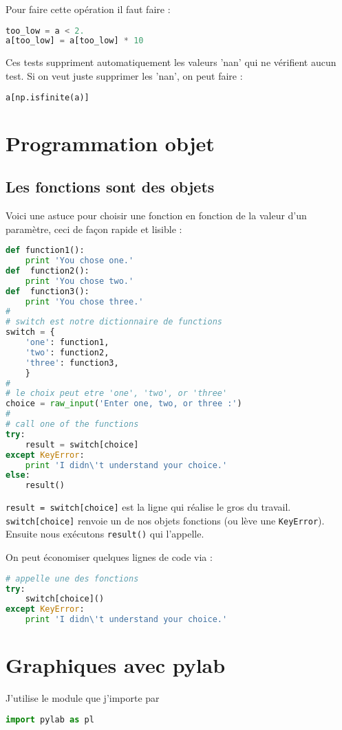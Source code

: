 \documentclass[a4paper,twoside]{article}
\begin{document}
Pour faire cette opération il faut faire :
\begin{lstlisting}[language=python]
too_low = a < 2.
a[too_low] = a[too_low] * 10
\end{lstlisting}

\bigskip

Ces tests suppriment automatiquement les valeurs 'nan' qui ne vérifient aucun test. Si on veut juste supprimer les 'nan', on peut faire :
\begin{lstlisting}[language=python]
a[np.isfinite(a)]
\end{lstlisting}



\section{Programmation objet}
\subsection{Les fonctions sont des objets}
Voici une astuce pour choisir une fonction en fonction de la valeur d'un paramètre, ceci de façon rapide et lisible :
\begin{lstlisting}[language=python]
def function1():
    print 'You chose one.'
def  function2():
    print 'You chose two.'
def  function3():
    print 'You chose three.'
#
# switch est notre dictionnaire de functions
switch = {
    'one': function1,
    'two': function2,
    'three': function3,
    }
#
# le choix peut etre 'one', 'two', or 'three'
choice = raw_input('Enter one, two, or three :')
#
# call one of the functions
try:
    result = switch[choice]
except KeyError:
    print 'I didn\'t understand your choice.'
else:
    result()
\end{lstlisting}

\verb|result = switch[choice]| est la ligne qui réalise le gros du travail. \verb|switch[choice]| renvoie un de nos objets fonctions (ou lève une \verb|KeyError|). Ensuite nous exécutons \verb|result()| qui l’appelle.

On peut économiser quelques lignes de code via :
\begin{lstlisting}[language=python]
# appelle une des fonctions
try:
    switch[choice]()
except KeyError:
    print 'I didn\'t understand your choice.'
\end{lstlisting}



\section{Graphiques avec pylab}
J'utilise le module  que j'importe par
\begin{lstlisting}[language=python]
import pylab as pl
\end{lstlisting}
\end{document}
